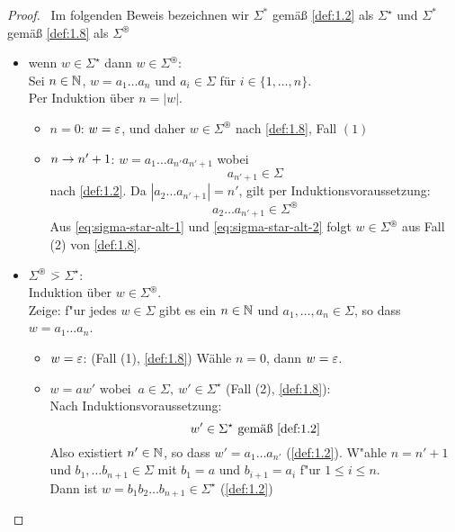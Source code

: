 \begin{proof}\ 
  Im folgenden Beweis bezeichnen wir $\Sigma^* $ gemäß \autoref{def:1.2} als $\Sigma^\star$ und $\Sigma^*$ gemäß \autoref{def:1.8} als $\Sigma^\circledast$
	\begin{itemize}
  \item wenn $w \in \Sigma^\star$ dann $w \in \Sigma^\circledast$: \\
    Sei $n \in \mathbb{N}$, $w = a_1\dots a_n$ und $a_i\in\Sigma$ für $i \in \{1, \ldots, n\}$.
    \\
		Per Induktion über $n = |w|$.
    \begin{itemize}
    \item \underline{$n=0$}:
      $w = \varepsilon$, und daher $w \in \Sigma^\circledast$ nach \autoref{def:1.8}, Fall $(1)$
    \item \underline{$n\->n'+1$}:
      $w = a_1\dots a_{n'} a_{n'+1}$ wobei
      \begin{equation}
        \label{eq:sigma-star-alt-1}
        a_{n'+1} \in \Sigma
      \end{equation}
      nach \autoref{def:1.2}.
      Da $|a_2\dots a_{n'+1}| = n'$, gilt per Induktionsvoraussetzung:
      \begin{equation}
        \label{eq:sigma-star-alt-2}
        a_2 \dots a_{n'+1} \in \Sigma^\circledast
      \end{equation}
      Aus \eqref{eq:sigma-star-alt-1} und \eqref{eq:sigma-star-alt-2} folgt $w \in \Sigma^\circledast$ aus Fall (2) von \autoref{def:1.8}.
    \end{itemize}
		
  \item $\Sigma^\circledast$ \=> $\Sigma^\star$:\\
		Induktion über $w\in\Sigma^\circledast$.\\
		Zeige: f"ur jedes $w\in\Sigma$ gibt es ein $n\in\mathbb{N}$ und $a_1, \dots, a_n \in \Sigma$, so dass $w=a_1\dots a_n$.
		\begin{itemize}
    \item \underline{$w = \varepsilon$}: (Fall (1), \autoref{def:1.8})
      Wähle $n=0$, dann $w=\varepsilon$.
    \item \underline{$w = aw' \text{ wobei }\ a\in\Sigma,\ w'\in\Sigma^\star$} (Fall (2), \autoref{def:1.8}):\\
        Nach Induktionsvoraussetzung:
        \begin{displaymath}
          w'\in\Sigma^\star \text{ gemäß \autoref{def:1.2}}
        \end{displaymath}
			Also existiert $n' \in \mathbb{N}$, so dass $w'=a_1\dots a_{n'}$ (\autoref{def:1.2}).
			W"ahle $n = n'+1$ und $b_1, \dots b_{n+1} \in\Sigma$
			mit $b_1 = a$ und $b_{i+1} = a_i$ f"ur $1\le i\le n$.\\
			Dann ist $w = b_1b_2\dots b_{n+1}\in\Sigma^\star$ (\ref{def:1.2}) \qedhere
	\end{itemize}
	\end{itemize}
\end{proof}
